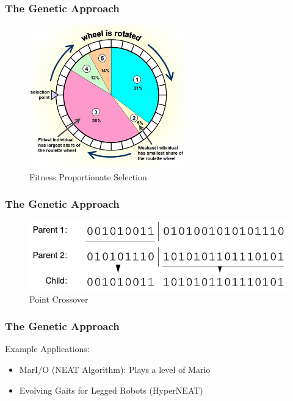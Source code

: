 \documentclass{beamer}
\begin{document}
\begin{frame}
	\frametitle{The Genetic Approach}
	
	\begin{figure}[H]
		\centering
		\includegraphics[width=0.6\textwidth]{imgs/fitness_proportionate_selection}
		\caption{Fitness Proportionate Selection}
		\label{fig:ga_algorithm}
	\end{figure}	
\end{frame}


\begin{frame}
	\frametitle{The Genetic Approach}
	
	\begin{figure}[H]
		\centering
		\includegraphics[width=\textwidth]{imgs/point_crossover}
		\caption{Point Crossover}
		\label{fig:ga_algorithm}
	\end{figure}	
\end{frame}


\begin{frame}
	\frametitle{The Genetic Approach}
	Example Applications:
	
	\begin{itemize}
		\item{MarI/O (NEAT Algorithm): Plays a level of Mario \href{https://www.youtube.com/watch?v=qv6UVOQ0F44}{}}
		
		\item{Evolving Gaits for Legged Robots (HyperNEAT) \href{https://www.youtube.com/watch?v=V2ADU8YWIug}{}}
	\end{itemize}
\end{frame}
\end{document}
